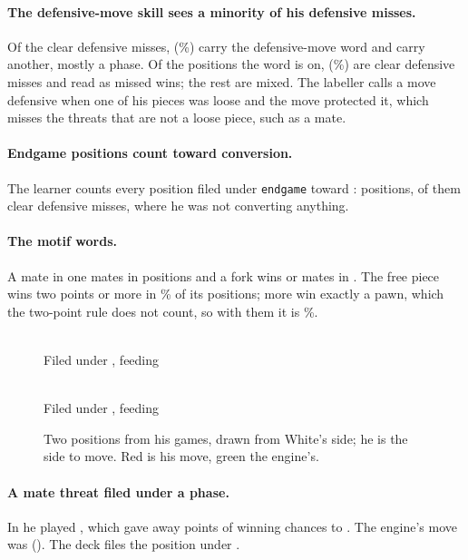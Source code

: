 \documentclass[11pt]{article}
\begin{document}
\paragraph{The defensive-move skill sees a minority of his defensive misses.} Of the
\Defensive{} clear defensive misses, \DefFitK{} (\DefRecall\%) carry the defensive-move word and
\DefensiveElsewhere{} carry another, mostly a phase. Of the \DefItems{} positions the word is
on, \DefFitK{} (\DefFit\%) are clear defensive misses and \DefAttacking{} read as missed wins;
the rest are mixed. The labeller calls a move defensive when one of his pieces was loose and the
move protected it, which misses the threats that are not a loose piece, such as a mate.

\paragraph{Endgame positions count toward conversion.} The learner counts every position filed
under \texttt{endgame} toward \EndgameCompetency: \EndgameItems{} positions, \EndgameDefensive{}
of them clear defensive misses, where he was not converting anything.

\paragraph{The motif words.} A mate in one mates in \MateFit{} positions and a fork wins or mates
in \ForkFit. The free piece wins two points or more in \HangFit\% of its \HangItems{} positions;
\HangPawn{} more win exactly a pawn, which the two-point rule does not count, so with them it is
\HangFitPawn\%.

\begin{figure}[h]
\centering
\begin{minipage}[t]{0.47\textwidth}\centering
\DefBoard\\[0.3em]
\footnotesize Filed under \DefTheme, feeding \DefSkill
\end{minipage}\hfill
\begin{minipage}[t]{0.47\textwidth}\centering
\WinBoard\\[0.3em]
\footnotesize Filed under \WinTheme, feeding \WinSkill
\end{minipage}
\caption{Two positions from his games, drawn from White's side; he is the side to move. Red is
his move, green the engine's.}
\end{figure}

\paragraph{A mate threat filed under a phase.} In \DefFen{} he played \DefPlayed, which gave
away \DefDrop{} points of winning chances to \DefPunish. The engine's move was \DefLine{}
(\DefUci). The deck files the position under \DefTheme.
\end{document}
